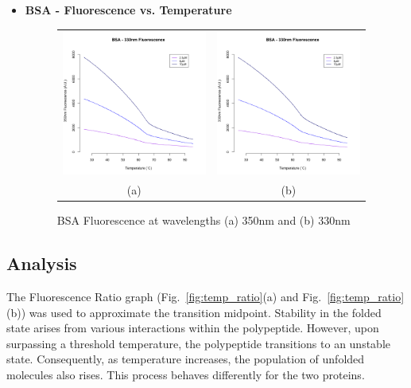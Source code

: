 \documentclass[a4paper,11pt]{article}
\begin{document}
\begin{itemize}
                \item {\bfseries BSA - Fluorescence vs. Temperature}
                \begin{figure}[H]
                    \centering
                    \begin{tabular}{cc}
                        \includegraphics[width=180px]{../resources/unfolding_BSA_350.png} &
                        \includegraphics[width=180px]{../resources/unfolding_BSA_330.png} \\
                        (a) & (b)\\
                    \end{tabular}
                    \caption{BSA Fluorescence at wavelengths (a) 350nm and (b) 330nm}\label{fig:bsa_flr}
                \end{figure}
            \end{itemize}

        \subsection*{Analysis}
            The Fluorescence Ratio graph (Fig.~\ref{fig:temp_ratio}(a) and Fig.~\ref{fig:temp_ratio}(b)) was used to 
            approximate the transition midpoint. 
            Stability in the folded state arises from various interactions within the polypeptide. 
            However, upon surpassing a threshold temperature, the polypeptide 
            transitions to an unstable state. Consequently, as temperature increases, the population 
            of unfolded molecules also rises. This process behaves differently for the two proteins. 
\end{document}

